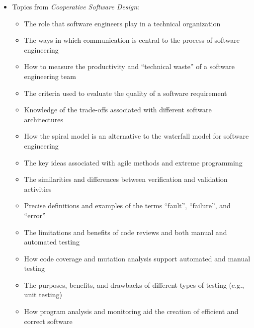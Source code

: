\documentclass[11pt]{article}
\newcommand{\cooperative}{{\em Cooperative Software Design\/}}
\begin{document}
\begin{itemize}
\begin{itemize}
    \end{itemize}

  \item Topics from \cooperative{}:
    \vspace*{-.05in}
    \begin{itemize}

      \itemsep 0.025in

      \item The role that software engineers play in a technical organization

      \item The ways in which communication is central to the process of
        software engineering

      \item How to measure the productivity and ``technical waste'' of a
        software engineering team

      \item The criteria used to evaluate the quality of a software requirement

      \item Knowledge of the trade-offs associated with different software
        architectures

      \item How the spiral model is an alternative to the waterfall model for
        software engineering

      \item The key ideas associated with agile methods and extreme programming

      \item The similarities and differences between verification and validation
        activities

      \item Precise definitions and examples of the terms ``fault'',
        ``failure'', and ``error''

      \item The limitations and benefits of code reviews and both manual and
        automated testing

      \item How code coverage and mutation analysis support automated and manual
        testing

      \item The purposes, benefits, and drawbacks of different types of testing
        (e.g., unit testing)

      \item How program analysis and monitoring aid the creation of efficient
        and correct software


\end{itemize}
\end{itemize}
\end{document}
